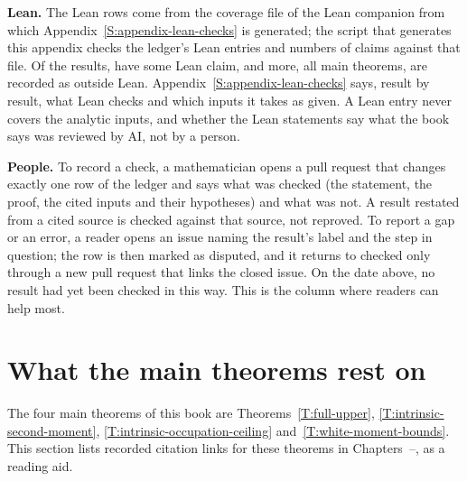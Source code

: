 \medskip
\noindent\textbf{Lean.} The Lean rows come from the coverage file of the Lean
companion from which Appendix~\ref{S:appendix-lean-checks} is generated; the
script that generates this appendix checks the ledger's Lean entries and
numbers of claims against that file. Of the \vsRows{} results, \vsLeanAny{}
have some Lean claim, and \vsOutside{} more, all main theorems, are recorded as
outside Lean. Appendix~\ref{S:appendix-lean-checks} says, result by result,
what Lean checks and which inputs it takes as given. A Lean entry never
covers the analytic inputs, and whether the Lean statements say what the book
says was reviewed by AI, not by a person.

\medskip
\noindent\textbf{People.} To record a check, a mathematician opens a pull
request that changes exactly one row of the ledger and says what was checked
(the statement, the proof, the cited inputs and their hypotheses) and what was
not. A result restated from a cited source is checked against that source,
not reproved. To report a gap or an error, a reader opens an issue naming the
result's label and the step in question; the row is then marked as disputed,
and it returns to checked only through a new pull request that links the
closed issue.
\ifnum{} On the date above, no result had yet been checked in
this way. \fi
This is the column where readers can help most.

\section{What the main theorems rest on}\label{S:critical-path}

The four main theorems of this book are
Theorems~\ref{T:full-upper}, \ref{T:intrinsic-second-moment},
\ref{T:intrinsic-occupation-ceiling} and~\ref{T:white-moment-bounds}. This
section lists recorded citation links for these theorems in
Chapters~\cpFirstChapter{}--\cpLastChapter{}, as a reading aid.

